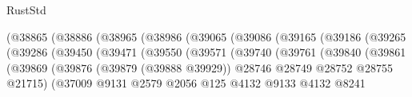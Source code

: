 \begin{lexlean}{RustStd}
\begin{coremodule}
                                      (@38865
                                        (@38886
                                          (@38965
                                            (@38986
                                              (@39065
                                                (@39086
                                                  (@39165
                                                    (@39186
                                                      (@39265
                                                        (@39286
                                                          (@39450
                                                            (@39471
                                                              (@39550
                                                                (@39571
                                                                  (@39740
                                                                    (@39761
                                                                      (@39840
                                                                        (@39861
                                                                          (@39869
                                                                            (@39876
                                                                              (@39879
                                                                                (@39888 @39929))
                                                                              @28746
                                                                              @28749
                                                                              @28752
                                                                              @28755
                                                                              @21715)
                                                                            (@37009
                                                                              @9131
                                                                              @2579
                                                                              @2056
                                                                              @125
                                                                              @4132
                                                                              @9133
                                                                              @4132
                                                                              @8241

\end{coremodule}
\end{lexlean}
